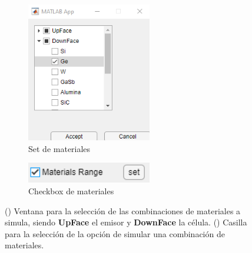 	\begin{figure}[H]%
		\begin{subfigure}[b]{0.48\textwidth}
			\centering
				\includegraphics[width=0.6\textwidth]{figuras/Procedimiento_Simulaciones/Radiacion/set_materilas2.png}
			\caption{Set de materiales}
			\label{fig:set_materials2}
		\end{subfigure}\hfill
			\begin{subfigure}[b]{0.48\textwidth}
			\centering
				\includegraphics[width=0.6\textwidth]{figuras/Procedimiento_Simulaciones/Radiacion/check_materials2.png}
			\caption{Checkbox de materiales}
			\label{fig:check_materials2}
		\end{subfigure}
		\caption{() Ventana para la selección de las combinaciones de materiales a simula, siendo \textbf{UpFace} el emisor y \textbf{DownFace} la célula.	() Casilla para la selección de la opción de simular una combinación de materiales.}%
		\label{fig:sets2}%
	\end{figure}	
